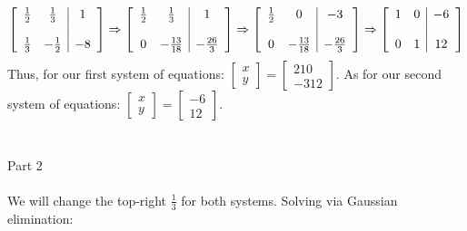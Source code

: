 \documentclass[10pt]{article} %
\begin{document}
\[ 
\left[
\begin{array}{c c | c}
\frac{1}{2} & \frac{1}{3} & 1\\
& & \\
\frac{1}{3} & -\frac{1}{2} & -8
\end{array}
\right]
\Rightarrow
\left[
\begin{array}{c c | c}
\frac{1}{2} & \frac{1}{3} & 1\\
& & \\
0 & -\frac{13}{18} & -\frac{26}{3}
\end{array}
\right]
\Rightarrow
\left[
\begin{array}{c c | c}
\frac{1}{2} & 0 & -3\\
& & \\
0 & -\frac{13}{18} & -\frac{26}{3}
\end{array}
\right]
\Rightarrow
\left[
\begin{array}{c c | c}
1 & 0 & -6\\
& & \\
0 & 1 & 12
\end{array}
\right]
\]
Thus, for our first system of equations: $\left[\begin{array}{c} x \\ y \end{array}\right] = \left[\begin{array}{c} 210 \\ -312 \end{array}\right]$. As for our second system of equations: $\left[\begin{array}{c} x \\ y \end{array}\right] = \left[\begin{array}{c} -6 \\ 12 \end{array}\right]$.
\\ \\ \\
\noindent \large{Part 2}
\\ \\
\normalsize{We will change the top-right $\frac{1}{3}$ for both systems. Solving via Gaussian elimination:}
\end{document}
